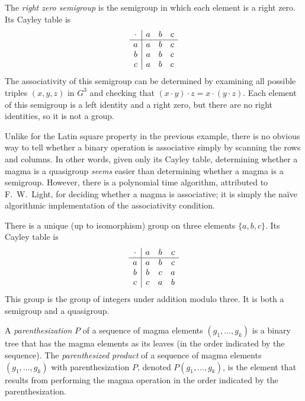 \documentclass{article}
\begin{document}
\begin{example}\label{ex:zero}
  The \emph{right zero semigroup} is the semigroup in which each element is a right zero.
  Its Cayley table is
  \begin{equation*}
    \begin{array}{c | c c c}
      \cdot & a & b & c \\
      \hline
      a & a & b & c \\
      b & a & b & c \\
      c & a & b & c \\
    \end{array}
  \end{equation*}
  The associativity of this semigroup can be determined by examining all possible triples $(x, y, z)$ in $G^3$ and checking that $(x \cdot y) \cdot z = x \cdot (y \cdot z)$.
  Each element of this semigroup is a left identity and a right zero, but there are no right identities, so it is not a group.

  Unlike for the Latin square property in the previous example, there is no obvious way to tell whether a binary operation is associative simply by scanning the rows and columns.
  In other words, given only its Cayley table, determining whether a magma is a quasigroup \emph{seems} easier than determining whether a magma is a semigroup.
  However, there is a polynomial time algorithm, attributed to F.~W.~Light, for deciding whether a magma is associative; it is simply the naïve algorithmic implementation of the associativity condition.
\end{example}

\begin{example}
  There is a unique (up to isomorphism) group on three elements $\{a, b, c\}$.
  Its Cayley table is
  \begin{equation*}
    \begin{array}{c | c c c}
      \cdot & a & b & c \\
      \hline
      a & a & b & c \\
      b & b & c & a \\
      c & c & a & b \\
    \end{array}
  \end{equation*}
  This group is the group of integers under addition modulo three.
  It is both a semigroup and a quasigroup.
\end{example}

A \emph{parenthesization} $P$ of a sequence of magma elements $(g_1, \dotsc, g_k)$ is a binary tree that has the magma elements as its leaves (in the order indicated by the sequence).
The \emph{parenthesized product} of a sequence of magma elements $(g_1, \dotsc, g_k)$ with parenthesization $P$, denoted $P(g_1, \dotsc, g_k)$, is the element that results from performing the magma operation in the order indicated by the parenthesization.
\end{document}

